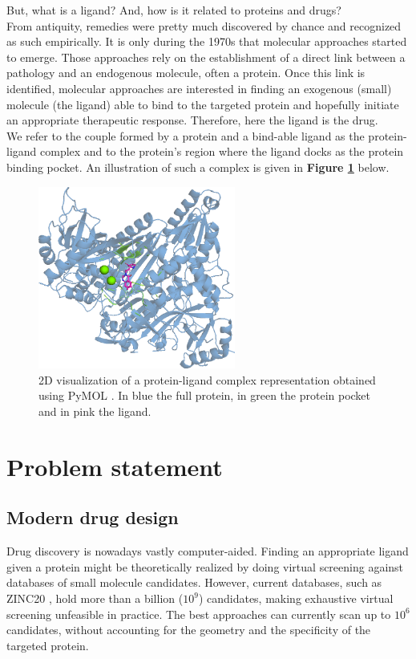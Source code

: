 \documentclass{article}
\begin{document}
But, what is a ligand? And, how is it related to proteins and drugs? \\
From antiquity, remedies were pretty much discovered by chance and recognized as such empirically. It is only during the 1970s that molecular approaches started to emerge. Those approaches rely on the establishment of a direct link between a pathology and an endogenous molecule, often a protein. Once this link is identified, molecular approaches are interested in finding an exogenous (small) molecule (the ligand) able to bind to the targeted protein and hopefully initiate an appropriate therapeutic response. \cite{WikiDrug} Therefore, here the ligand is the drug. \\
We refer to the couple formed by a protein and a bind-able ligand as the protein-ligand complex and to the protein's region where the ligand docks as the protein binding pocket. An illustration of such a complex is given in \textbf{Figure \ref{fig:complex}} below.
\begin{figure}[H]
    \centering
    \includegraphics[height=6cm,width=\textwidth,keepaspectratio]{complex.png}
    \caption{2D visualization of a protein-ligand complex representation obtained using PyMOL \cite{PyMOL}. In blue the full protein, in green the protein pocket and in pink the ligand.}
    \label{fig:complex}
\end{figure}

\clearpage

\section{Problem statement}

\subsection{Modern drug design}

Drug discovery is nowadays vastly computer-aided. Finding an appropriate ligand given a protein might be theoretically realized by doing virtual screening against databases of small molecule candidates. However, current databases, such as ZINC20 \cite{zinc}, hold more than a billion ($10^9$) candidates, making exhaustive virtual screening unfeasible in practice. The best approaches can currently scan up to $10^6$ candidates, without accounting for the geometry and the specificity of the targeted protein.
\end{document}
